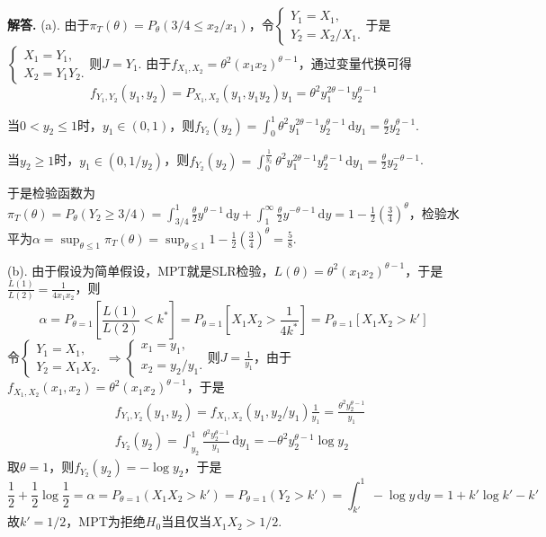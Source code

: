 \documentclass[12pt, a4paper, oneside]{ctexart}
\newenvironment{solution}[1][]{\par\noindent\textbf{#1解答. }}{\smallskip\par}  %
\let\leq=\leqslant %
\let\geq=\geqslant %
\def\d{\mathrm{d}}          %
\begin{document}
\begin{solution}
    (a). 由于$\pi_T(\theta) = P_\theta(3/4\leq x_2/x_1)$，令$\begin{cases}
        Y_1 = X_1,\\ Y_2=X_2/X_1.
    \end{cases}$于是$\begin{cases}
        X_1=Y_1,\\
        X_2=Y_1Y_2.
    \end{cases}$则$J = Y_1$. 由于$f_{X_1,X_2} = \theta^2(x_1x_2)^{\theta-1}$，通过变量代换可得
    \begin{equation*}
        f_{Y_1,Y_2}(y_1,y_2) = P_{X_1,X_2}(y_1,y_1y_2)y_1 = \theta^2 y_1^{2\theta-1}y_2^{\theta-1}
    \end{equation*}

    当$0 < y_2\leq 1$时，$y_1\in (0,1)$，则$f_{Y_2}(y_2) = \int_0^1\theta^2y_1^{2\theta-1}y_2^{\theta-1}\,\d y_1 = \frac{\theta}{2}y_2^{\theta-1}$.

    当$y_2\geq 1$时，$y_1\in (0,1/y_2)$，则$f_{Y_2}(y_2) = \int_0^{\frac{1}{y_2}}\theta^2y_1^{2\theta-1}y_2^{\theta-1}\,\d y_1 = \frac{\theta}{2}y_2^{-\theta-1}$.

    于是检验函数为$\pi_T(\theta) = P_{\theta}(Y_2\geq 3/4)=\int_{3/4}^1\frac{\theta}{2}y^{\theta-1}\,\d y+\int_1^\infty\frac{\theta}{2}y^{-\theta-1}\,\d y = 1-\frac{1}{2}\left(\frac{3}{4}\right)^{\theta}$，检验水平为$\alpha = \sup_{\theta\leq 1}\pi_T(\theta) = \sup_{\theta \leq 1}1-\frac{1}{2}\left(\frac{3}{4}\right)^\theta = \frac{5}{8}$.

    (b). 由于假设为简单假设，MPT就是SLR检验，$L(\theta) = \theta^2(x_1x_2)^{\theta-1}$，于是$\frac{L(1)}{L(2)} = \frac{1}{4x_1x_2}$，则
    \begin{equation*}
        \alpha=P_{\theta=1}\left[\frac{L(1)}{L(2)}< k^*\right]= P_{\theta = 1}\left[X_1X_2> \frac{1}{4k^*}\right] = P_{\theta = 1}[X_1X_2> k']
    \end{equation*}
    令$\begin{cases}
        Y_1 = X_1,\\
        Y_2 = X_1X_2.
    \end{cases}\Rightarrow \begin{cases}
        x_1 = y_1,\\
        x_2 = y_2/y_1.
    \end{cases}$则$J = \frac{1}{y_1}$，由于$f_{X_1,X_2}(x_1,x_2) = \theta^2(x_1x_2)^{\theta-1}$，于是
    \begin{align*}
        &\ f_{Y_1,Y_2}(y_1,y_2) = f_{X_1,X_2}(y_1,y_2/y_1)\frac{1}{y_1} = \frac{\theta^2y_2^{\theta-1}}{y_1}\\
        &\ f_{Y_2}(y_2) = \int_{y_2}^1\frac{\theta^2y_2^{\theta-1}}{y_1}\,\d y_1 = -\theta^2y_2^{\theta-1}\log y_2
    \end{align*}
    取$\theta = 1$，则$f_{Y_2}(y_2) = -\log y_2$，于是
    \begin{equation*}
        \frac{1}{2}+\frac{1}{2}\log\frac{1}{2}=\alpha = P_{\theta=1}(X_1X_2> k') = P_{\theta = 1}(Y_2> k') = \int_{k'}^1-\log y\,\d y = 1+k'\log k'-k'
    \end{equation*}
    故$k' = 1/2$，MPT为拒绝$H_0$当且仅当$X_1X_2> 1/2$.


\end{solution}
\end{document}
